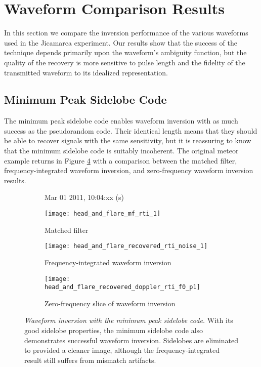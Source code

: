 \section{Waveform Comparison Results}
In this section we compare the inversion performance of the various waveforms used in the Jicamarca experiment. Our results show that the success of the technique depends primarily upon the waveform's ambiguity function, but the quality of the recovery is more sensitive to pulse length and the fidelity of the transmitted waveform to its idealized representation.

\subsection{Minimum Peak Sidelobe Code}
The minimum peak sidelobe code enables waveform inversion with as much success as the pseudorandom code. Their identical length means that they should be able to recover signals with the same sensitivity, but it is reassuring to know that the minimum sidelobe code is suitably incoherent. The original meteor example returns in Figure \ref{fig:msl_comparison} with a comparison between the matched filter, frequency-integrated waveform inversion, and zero-frequency waveform inversion results.
\begin{figure}[tpb]
 \vspace{-1.5\baselineskip}
 \begin{subfigure}{\textwidth}
  \centering
  \textsf{\footnotesize Mar 01 2011, 10:04:xx (s)}
  
  \texttt{[image: head\_and\_flare\_mf\_rti\_1]}
  \caption{Matched filter}
  \label{fig:msl_mf}
 \end{subfigure}
 
 \vspace{0.5\baselineskip}
 \begin{subfigure}{\textwidth}
  \centering
  \texttt{[image: head\_and\_flare\_recovered\_rti\_noise\_1]}
  \caption{Frequency-integrated waveform inversion}
  \label{fig:msl_recovered}
 \end{subfigure}
 
 \vspace{0.5\baselineskip}
 \begin{subfigure}{\textwidth}
  \centering
  \texttt{[image: head\_and\_flare\_recovered\_doppler\_rti\_f0\_p1]}
  \caption{Zero-frequency slice of waveform inversion}
  \label{fig:msl_recovered_dopplerslice}
 \end{subfigure}
 \caption[Waveform inversion with the minimum peak sidelobe code]{\emph{Waveform inversion with the minimum peak sidelobe code.} With its good sidelobe properties, the minimum sidelobe code also demonstrates successful waveform inversion. Sidelobes are eliminated to provided a cleaner image, although the frequency-integrated result still suffers from mismatch artifacts.}
 \label{fig:msl_comparison}
\end{figure}%
